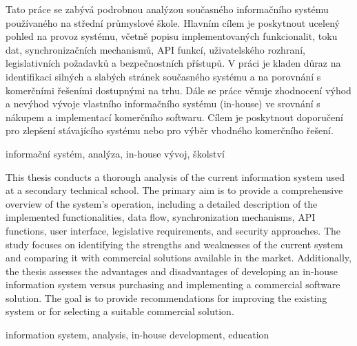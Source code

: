 \documentclass[FM,Proj]{tulthesis}
\begin{document}

\begin{abstractCZ}
Tato práce se zabývá podrobnou analýzou současného informačního systému používaného
na střední průmyslové škole. Hlavním cílem je poskytnout ucelený pohled na provoz
systému, včetně popisu implementovaných funkcionalit, toku dat, synchronizačních 
mechanismů, API funkcí, uživatelského rozhraní, legislativních požadavků a 
bezpečnostních přístupů. V práci je kladen důraz na identifikaci silných a 
slabých stránek současného systému a na porovnání s komerčními řešeními dostupnými
na trhu. Dále se práce věnuje zhodnocení výhod a nevýhod vývoje vlastního informačního
systému (in-house) ve srovnání s nákupem a implementací komerčního softwaru. Cílem 
je poskytnout doporučení pro zlepšení stávajícího systému nebo pro výběr 
vhodného komerčního řešení.
\end{abstractCZ}

\begin{keywordsCZ}
informační systém, analýza, in-house vývoj, školství
\end{keywordsCZ}

\vspace{2cm}

\begin{abstractEN}
This thesis conducts a thorough analysis of the current information system
used at a secondary technical school. The primary aim is to provide a comprehensive 
overview of the system's operation, including a detailed description of the implemented 
functionalities, data flow, synchronization mechanisms, API functions, user interface, 
legislative requirements, and security approaches. The study focuses on identifying 
the strengths and weaknesses of the current system and comparing it with commercial 
solutions available in the market. Additionally, the thesis assesses the advantages 
and disadvantages of developing an in-house information system versus purchasing and 
implementing a commercial software solution. The goal is to provide recommendations 
for improving the existing system or for selecting a suitable commercial solution.
\end{abstractEN}

\begin{keywordsEN}
information system, analysis, in-house development, education
\end{keywordsEN}

\clearpage
\end{document}
